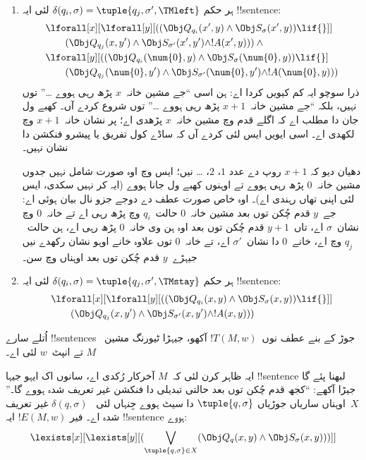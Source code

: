 \documentclass[../../../include/open-logic-section]{subfiles}
\begin{document}
\begin{enumerate}
\begin{enumerate}
\item {} ہر حکم $\delta(q_i, \sigma) =
  \tuple{q_j, \sigma', \TMleft}$ لئی ایہ !!{sentence}:
\begin{align*}
& \lforall[x][\lforall[y][
    ((\Obj Q_{q_i}(x', y) \land \Obj S_{\sigma}(x', y)) \lif {}]]\\
& \qquad   (\Obj Q_{q_j}(x, y') \land \Obj S_{\sigma'}(x', y') \land
!A(x', y))) \land {}\\
& \lforall[y][((\Obj Q_{q_i}(\num{0}, y) \land \Obj S_{\sigma}(\num{0},
    y)) \lif {}]\\
& \qquad (\Obj Q_{q_j}(\num{0}, y') \land \Obj S_{\sigma'}(\num{0},
  y') \land !A(\num{0}, y)))
\end{align*}
ذرا سوچو ایہ کم کیویں کردا اے: ہن اسی “جے مشین خانہ~$x$
پڑھ رہی ہووے \dots” توں نہیں، بلکہ “جے مشین خانہ~$x+1$
پڑھ رہی ہووے \dots” توں شروع کردے آں۔ کھبے ول جان دا
مطلب اے کہ اگلے قدم وچ مشین خانہ~$x$ پڑھدی اے؛ پر
نشان خانہ~$x+1$ وچ لکھدی اے۔ اسی ایویں ایس لئی کردے
آں کہ ساڈے کول تفریق یا پیشرو فنکشن دا نشان نہیں۔

دھیان دیو کہ $x+1$ روپ دے عدد $1$، $2$، \dots{} نیں؛
ایس وچ اوہ صورت شامل نہیں جدوں مشین خانہ~$0$ پڑھ رہی
ہووے تے اوہنوں کھبے ول جانا ہووے (ایہ کر نہیں سکدی،
ایس لئی اپنی تھاں رہندی اے)۔ اوہ خاص صورت عطف دے دوجے
جزو نال بیان ہوئی اے: جے~$y$ قدم چُکن توں بعد مشین
خانہ~$0$ حالت~$q_i$ وچ پڑھ رہی اے تے خانہ~$0$
وچ نشان~$\sigma$ اے، تاں~$y+1$ قدم چُکن توں بعد
اوہ ہن وی خانہ~$0$ پڑھ رہی اے، ہن حالت~$q_j$
وچ اے، خانے~$0$ دا نشان~$\sigma'$ اے، تے
خانہ~$0$ توں علاوہ خانے اوہو نشان رکھدے نیں
جیہڑے~$y$ قدم چُکن توں بعد اوہناں وچ سن۔
\item {} ہر حکم $\delta(q_i, \sigma) =
  \tuple{q_j, \sigma', \TMstay}$ لئی ایہ !!{sentence}:
\begin{align*}
& \lforall[x][\lforall[y][(
   (\Obj Q_{q_i}(x, y) \land \Obj S_{\sigma}(x, y)) \lif {}]] \\
&\qquad   (\Obj Q_{q_j}(x, y') \land \Obj S_{\sigma'}(x, y') \land
!A(x, y)))
\end{align*}
\end{enumerate}
\end{enumerate}
اُتلے سارے !!{sentence}s جوڑ کے بنے عطف نوں~$!T(M, w)$
آکھو، جیہڑا ٹیورنگ مشین~$M$ تے انپٹ~$w$ لئی اے۔

ایہ ظاہر کرن لئی کہ~$M$ آخرکار رُکدی اے، سانوں
اک ایہو جیہا !!{sentence} لبھنا پئے گا جیڑا آکھے: “کجھ
قدم چُکن توں بعد حالتی تبدیلی دا فنکشن غیر تعریف
شدہ ہووے گا۔” $X$~اوہناں ساریاں جوڑیاں
$\tuple{q, \sigma}$ دا سیٹ ہووے جِنہاں لئی
~$\delta(q, \sigma)$ غیر تعریف شدہ اے۔ فیر
$!E(M, w)$ ایہ !!{sentence} ہووے:
\[
\lexists[x][\lexists[y][(\bigvee_{\tuple{q, \sigma} \in
      X}(\Obj Q_q(x, y) \land \Obj S_\sigma(x, y)))]]
\]
\end{document}
